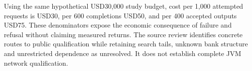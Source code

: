 Using the same hypothetical USD30,000 study budget, cost per 1,000 attempted requests is USD30, per 600 completions USD50, and per 400 accepted outputs USD75. These denominators expose the economic consequence of failure and refusal without claiming measured returns. The source review identifies concrete routes to public qualification while retaining search tails, unknown bank structure and unrestricted dependence as unresolved. It does not establish complete JVM network qualification.~\citep{exec25_jnet_choice}
